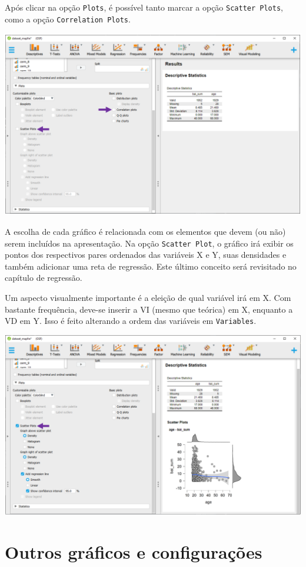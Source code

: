 \documentclass[
]{book}
\begin{document}
Após clicar na opção \texttt{Plots}, é possível tanto marcar a opção \texttt{Scatter\ Plots}, como a opção \texttt{Correlation\ Plots}.

\includegraphics{./img/cap_desc_jasp_grafico_scatter2.png}

A escolha de cada gráfico é relacionada com os elementos que devem (ou não) serem incluídos na apresentação. Na opção \texttt{Scatter\ Plot}, o gráfico irá exibir os pontos dos respectivos pares ordenados das variáveis X e Y, suas densidades e também adicionar uma reta de regressão. Este último conceito será revisitado no capítulo de regressão.

Um aspecto visualmente importante é a eleição de qual variável irá em X. Com bastante frequência, deve-se inserir a VI (mesmo que teórica) em X, enquanto a VD em Y. Isso é feito alterando a ordem das variáveis em \texttt{Variables}.

\includegraphics{./img/cap_desc_jasp_grafico_scatter3.png}

\hypertarget{outros-gruxe1ficos-e-configurauxe7uxf5es-1}{%
\section{Outros gráficos e configurações}\label{outros-gruxe1ficos-e-configurauxe7uxf5es-1}}
\end{document}
